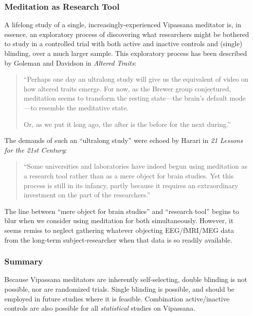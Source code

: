 \documentclass[a4paper, amsfonts, amssymb, amsmath, reprint, showkeys, nofootinbib, twoside]{revtex4-1}
\begin{document}
\subsubsection{Meditation as Research Tool}

A lifelong study of a single, increasingly-experienced Vipassana meditator
is, in essence, an exploratory process of discovering what researchers might be
bothered to study in a controlled trial with both active and inactive controls and
(single) blinding, over a much larger sample. This exploratory process has been
described by Goleman and Davidson in \textit{Altered Traits}:

\begin{quotation}
  ``Perhaps one day an ultralong study will give us the equivalent of video on how
  altered traits emerge. For now, as the Brewer group conjectured, meditation seems
  to transform the resting state---the brain's default mode---to resemble the
  meditative state.

  Or, as we put it long ago, the after is the before for the next
  during.'' \cite{goleman2017altered}
\end{quotation}

The demands of such an ``ultralong study'' were echoed by Harari in \textit{21
  Lessons for the 21st Century}:

\begin{quotation}
  ``Some universities and laboratories have indeed begun using meditation as a
  research tool rather than as a mere object for brain studies. Yet this process is
  still in its infancy, partly because it requires an extraordinary investment on the
  part of the researchers.'' \cite{harari201821}
\end{quotation}

The line between ``mere object for brain studies'' and ``research tool'' begins to
blur when we consider using meditation for both simultaneously. However, it seems remiss to neglect
gathering whatever objecting EEG/fMRI/MEG data from the long-term subject-researcher
when that data is so readily available.

\subsubsection{Summary}

Because Vipassana meditators are inherently self-selecting, double blinding is not
possible, nor are randomized trials. Single blinding is possible, and should be
employed in future studies where it is feasible. Combination active/inactive controls
are also possible for all \textit{statistical} studies on Vipassana.
\end{document}
